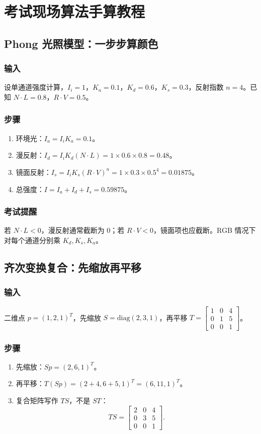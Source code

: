 \documentclass[UTF8,fontset=fandol,11pt]{ctexart}
\begin{document}
\section{考试现场算法手算教程}
\subsection{Phong 光照模型：一步步算颜色}
\subsubsection*{输入}
设单通道强度计算，$I_i=1$，$K_a=0.1$，$K_d=0.6$，$K_s=0.3$，反射指数 $n=4$。已知 $N\cdot L=0.8$，$R\cdot V=0.5$。
\subsubsection*{步骤}
\begin{enumerate}
  \item 环境光：$I_a=I_iK_a=0.1$。
  \item 漫反射：$I_d=I_iK_d(N\cdot L)=1\times0.6\times0.8=0.48$。
  \item 镜面反射：$I_s=I_iK_s(R\cdot V)^n=1\times0.3\times0.5^4=0.01875$。
  \item 总强度：$I=I_a+I_d+I_s=0.59875$。
\end{enumerate}
\subsubsection*{考试提醒}
若 $N\cdot L<0$，漫反射通常截断为 0；若 $R\cdot V<0$，镜面项也应截断。RGB 情况下对每个通道分别乘 $K_d,K_s,K_a$。

\subsection{齐次变换复合：先缩放再平移}
\subsubsection*{输入}
二维点 $p=(1,2,1)^T$，先缩放 $S=\mathrm{diag}(2,3,1)$，再平移 $T=\begin{bmatrix}1&0&4\\0&1&5\\0&0&1\end{bmatrix}$。
\subsubsection*{步骤}
\begin{enumerate}
  \item 先缩放：$Sp=(2,6,1)^T$。
  \item 再平移：$T(Sp)=(2+4,6+5,1)^T=(6,11,1)^T$。
  \item 复合矩阵写作 $TS$，不是 $ST$：
  \[
    TS=\begin{bmatrix}2&0&4\\0&3&5\\0&0&1\end{bmatrix}.
  \]
\end{enumerate}
\end{document}
